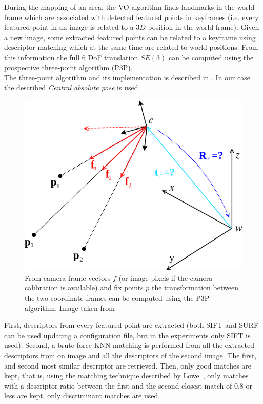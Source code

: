 During the mapping of an area, the VO algorithm finds landmarks in the world frame which are associated with detected featured points in keyframes (i.e. every featured point in an image is related to a $3D$ position in the world frame). Given a new image, some extracted featured points can be related to a keyframe using descriptor-matching which at the same time are related to world positions. From this information the full 6 DoF translation $SE(3)$ can be computed using the prospective three-point algorithm (P3P).\\

The three-point algorithm and its implementation is described in \cite{kneipopengv}. In our case the described \textit{Central absolute pose} is used.

\begin{figure}[htpb]
  \centering
  \includegraphics[width=0.6\linewidth]{img/absolute_central.png}
  \caption{From camera frame vectors $f$ (or image pixels if the camera calibration is available) and fix points $p$ the transformation between the two coordinate frames can be computed using the P3P algorithm. Image taken from \cite{kneipopengv}}
  \label{fig:img/absolute_centra}
\end{figure}

First, descriptors from every featured point are extracted (both SIFT and SURF can be used updating a configuration file, but in the experiments only SIFT is used). Second, a brute force KNN matching is performed from all the extracted descriptors from on image and all the descriptors of the second image. The first, and second most similar descriptor are retrieved. Then, only good matches are kept, that is, using the matching technique described by Lowe~\cite{lowe2004distinctive}, only matches with a descriptor ratio between the first and the second closest match of 0.8 or less are kept, only discriminant matches are used.\\

